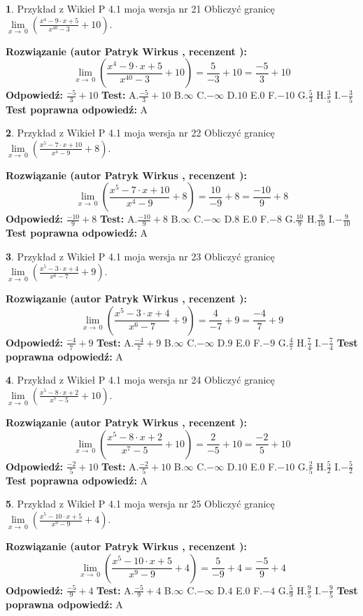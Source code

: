 \documentclass[12pt, a4paper]{article}
\theoremstyle{definition} %
\newtheorem{zad}{}
\newcommand{\zadStart}[1]{\begin{zad}#1\newline}
\newcommand{\zadStop}{\end{zad}}
\newcommand{\rozwStart}[2]{\noindent \textbf{Rozwiązanie (autor #1 , recenzent #2): }\newline}
\newcommand{\rozwStop}{\newline}
\newcommand{\odpStart}{\noindent \textbf{Odpowiedź:}\newline}
\newcommand{\odpStop}{\newline}
\newcommand{\testStart}{\noindent \textbf{Test:}\newline}
\newcommand{\testStop}{\newline}
\newcommand{\kluczStart}{\noindent \textbf{Test poprawna odpowiedź:}\newline}
\newcommand{\kluczStop}{\newline}
\begin{document}
\zadStart{Przykład z Wikieł P 4.1 moja wersja nr 21}
Obliczyć granicę $\lim\limits_{x\to\ 0}(\frac{x^{4}-9 \cdot x +5}{x^{40}-3}+10)$.
\zadStop
\rozwStart{Patryk Wirkus}{}
$$\lim\limits_{x\to\ 0}(\frac{x^{4}-9 \cdot x +5}{x^{40}-3}+10)=\frac{5}{-3}+10=\frac{-5}{3}+10$$
\rozwStop
\odpStart
$\frac{-5}{3}+10$
\odpStop
\testStart
A.$\frac{-5}{3}+10$
B.$\infty$
C.$-\infty$
D.$10$
E.$0$
F.$-10$
G.$\frac{5}{3}$
H.$\frac{3}{5}$
I.$-\frac{3}{5}$
\testStop
\kluczStart
A
\kluczStop



\zadStart{Przykład z Wikieł P 4.1 moja wersja nr 22}
Obliczyć granicę $\lim\limits_{x\to\ 0}(\frac{x^{5}-7 \cdot x +10}{x^{4}-9}+8)$.
\zadStop
\rozwStart{Patryk Wirkus}{}
$$\lim\limits_{x\to\ 0}(\frac{x^{5}-7 \cdot x +10}{x^{4}-9}+8)=\frac{10}{-9}+8=\frac{-10}{9}+8$$
\rozwStop
\odpStart
$\frac{-10}{9}+8$
\odpStop
\testStart
A.$\frac{-10}{9}+8$
B.$\infty$
C.$-\infty$
D.$8$
E.$0$
F.$-8$
G.$\frac{10}{9}$
H.$\frac{9}{10}$
I.$-\frac{9}{10}$
\testStop
\kluczStart
A
\kluczStop



\zadStart{Przykład z Wikieł P 4.1 moja wersja nr 23}
Obliczyć granicę $\lim\limits_{x\to\ 0}(\frac{x^{5}-3 \cdot x +4}{x^{6}-7}+9)$.
\zadStop
\rozwStart{Patryk Wirkus}{}
$$\lim\limits_{x\to\ 0}(\frac{x^{5}-3 \cdot x +4}{x^{6}-7}+9)=\frac{4}{-7}+9=\frac{-4}{7}+9$$
\rozwStop
\odpStart
$\frac{-4}{7}+9$
\odpStop
\testStart
A.$\frac{-4}{7}+9$
B.$\infty$
C.$-\infty$
D.$9$
E.$0$
F.$-9$
G.$\frac{4}{7}$
H.$\frac{7}{4}$
I.$-\frac{7}{4}$
\testStop
\kluczStart
A
\kluczStop



\zadStart{Przykład z Wikieł P 4.1 moja wersja nr 24}
Obliczyć granicę $\lim\limits_{x\to\ 0}(\frac{x^{5}-8 \cdot x +2}{x^{7}-5}+10)$.
\zadStop
\rozwStart{Patryk Wirkus}{}
$$\lim\limits_{x\to\ 0}(\frac{x^{5}-8 \cdot x +2}{x^{7}-5}+10)=\frac{2}{-5}+10=\frac{-2}{5}+10$$
\rozwStop
\odpStart
$\frac{-2}{5}+10$
\odpStop
\testStart
A.$\frac{-2}{5}+10$
B.$\infty$
C.$-\infty$
D.$10$
E.$0$
F.$-10$
G.$\frac{2}{5}$
H.$\frac{5}{2}$
I.$-\frac{5}{2}$
\testStop
\kluczStart
A
\kluczStop



\zadStart{Przykład z Wikieł P 4.1 moja wersja nr 25}
Obliczyć granicę $\lim\limits_{x\to\ 0}(\frac{x^{5}-10 \cdot x +5}{x^{9}-9}+4)$.
\zadStop
\rozwStart{Patryk Wirkus}{}
$$\lim\limits_{x\to\ 0}(\frac{x^{5}-10 \cdot x +5}{x^{9}-9}+4)=\frac{5}{-9}+4=\frac{-5}{9}+4$$
\rozwStop
\odpStart
$\frac{-5}{9}+4$
\odpStop
\testStart
A.$\frac{-5}{9}+4$
B.$\infty$
C.$-\infty$
D.$4$
E.$0$
F.$-4$
G.$\frac{5}{9}$
H.$\frac{9}{5}$
I.$-\frac{9}{5}$
\testStop
\kluczStart
A
\kluczStop
\end{document}
